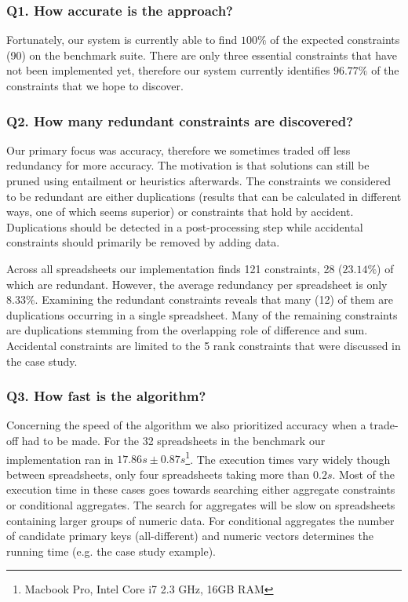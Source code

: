 \documentclass{ecai}
\begin{document}
\subsubsection*{Q1. How accurate is the approach?}
Fortunately, our system is currently able to find $100\%$ of the expected constraints (90) on the benchmark suite.
There are only three essential constraints that have not been implemented yet, therefore our system currently identifies $96.77\%$ of the constraints that we hope to discover.

\subsubsection*{Q2. How many redundant constraints are discovered?}
Our primary focus was accuracy, therefore we sometimes traded off less redundancy for more accuracy.
The motivation is that solutions can still be pruned using entailment or heuristics afterwards.
The constraints we considered to be redundant are either duplications (results that can be calculated in different ways, one of which seems superior) or constraints that hold by accident.
Duplications should be detected in a post-processing step while accidental constraints should primarily be removed by adding data.

Across all spreadsheets our implementation finds 121 constraints, 28 ($23.14\%$) of which are redundant.
However, the average redundancy per spreadsheet is only $8.33\%$.
Examining the redundant constraints reveals that many (12) of them are duplications occurring in a single spreadsheet.
Many of the remaining constraints are duplications stemming from the overlapping role of difference and sum.
Accidental constraints are limited to the 5 rank constraints that were discussed in the case study.

\subsubsection*{Q3. How fast is the algorithm?}
Concerning the speed of the algorithm we also prioritized accuracy when a trade-off had to be made.
For the 32 spreadsheets in the benchmark our implementation ran in $17.86s \pm 0.87s$\footnote{Macbook Pro, Intel Core i7 2.3 GHz, 16GB RAM}.
The execution times vary widely though between spreadsheets, only four spreadsheets taking more than $0.2s$.
Most of the execution time in these cases goes towards searching either aggregate constraints or conditional aggregates.
The search for aggregates will be slow on spreadsheets containing larger groups of numeric data.
For conditional aggregates the number of candidate primary keys (all-different) and numeric vectors determines the running time (e.g. the case study example).
\end{document}

